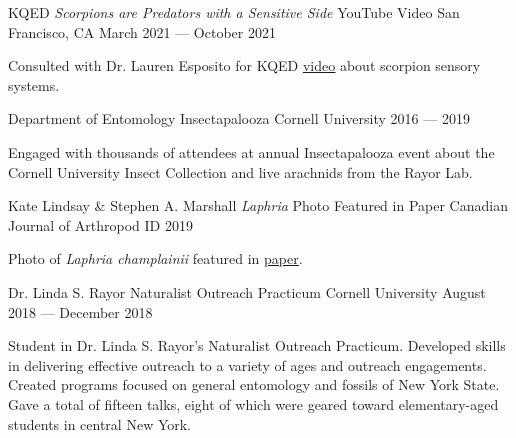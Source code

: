 

\begin{cventries}

  \cventry
    {KQED} %
    {\emph{Scorpions are Predators with a Sensitive Side} YouTube Video} %
    {San Francisco, CA} %
    {March 2021 — October 2021} %
    {
      \begin{cvitems} %
        \item {Consulted with Dr. Lauren Esposito for KQED \href{https://www.youtube.com/watch?v=3jtm9BdnE1U}{\underline{video}} about scorpion sensory systems.}
      \end{cvitems}
    }

  \cventry
    {Department of Entomology} %
    {Insectapalooza} %
    {Cornell University} %
    {2016 — 2019} %
    {
      \begin{cvitems} %
        \item {Engaged with thousands of attendees at annual Insectapalooza event about the Cornell University Insect Collection and live arachnids from the Rayor Lab.}
      \end{cvitems}
    }

  \cventry
    {Kate Lindsay \& Stephen A. Marshall} %
    {\emph{Laphria} Photo Featured in Paper} %
    {Canadian Journal of Arthropod ID} %
    {2019} %
    {
      \begin{cvitems} %
        \item {Photo of \emph{Laphria champlainii} featured in \href{https://cjai.biologicalsurvey.ca/lm_37/lm_37.pdf}{\underline{paper}}.}
      \end{cvitems}
    }

  \cventry
    {Dr. Linda S. Rayor} %
    {Naturalist Outreach Practicum} %
    {Cornell University} %
    {August 2018 — December 2018} %
    {
      \begin{cvitems} %
        \item {Student in Dr. Linda S. Rayor's Naturalist Outreach Practicum. Developed skills in delivering effective outreach to a variety of ages and outreach engagements. Created programs focused on general entomology and fossils of New York State. Gave a total of fifteen talks, eight of which were geared toward elementary-aged students in central New York.}
      \end{cvitems}
    }


\end{cventries}
